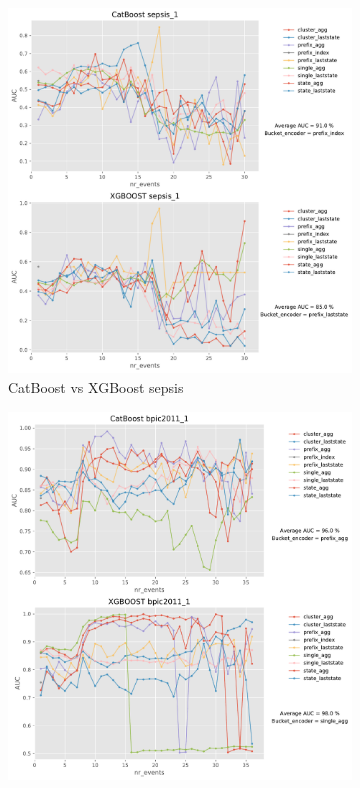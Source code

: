 \begin{figure}[!htb] %
	
	\begin{subfigure}{0.48\textwidth}
		\includegraphics[width=\linewidth]{images/catboost/graphs/sepsis_1_CatBoost_xgboost.pdf}
		\caption{CatBoost vs XGBoost sepsis} \label{fig:sepsis}
	\end{subfigure}\hspace*{\fill}
	\begin{subfigure}{0.48\textwidth}
		\includegraphics[width=\linewidth]{images/catboost/graphs/bpic2011_1_CatBoost_xgboost.pdf}

\end{subfigure}
\end{figure}
